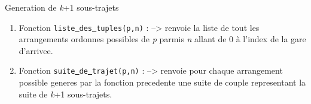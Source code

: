 \documentclass{beamer}
\begin{document}
 \begin{frame}{Generation de \textit{k}+1 sous-trajets}
 \begin{enumerate}
     \item Fonction \texttt{liste\underline{ }des\underline{ }tuples(p,n)} : \newline
     --> renvoie la liste de tout les arrangements ordonnes possibles de \textit{p} parmis \textit{n} allant de 0 à l'index de la gare d'arrivee. \newline\newline
     \item Fonction \texttt{suite\underline{ }de\underline{ }trajet(p,n)} : \newline
     --> renvoie pour chaque arrangement possible generes par la fonction precedente une suite de couple representant la suite de \textit{k}+1 sous-trajets.
 \end{enumerate}
 \end{frame}
 
\end{document}
